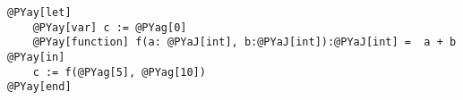 \begin{Verbatim}[commandchars=@\[\]]
@PYay[let] 
    @PYay[var] c := @PYag[0]
    @PYay[function] f(a: @PYaJ[int], b:@PYaJ[int]):@PYaJ[int] =  a + b
@PYay[in]
    c := f(@PYag[5], @PYag[10])
@PYay[end]
\end{Verbatim}
